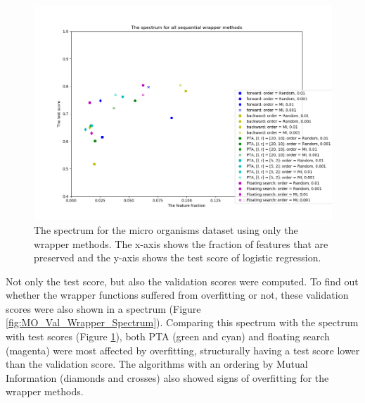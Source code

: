 \documentclass[10pt,a4paper]{article}
\begin{document}
	\begin{figure}[H]
		\includegraphics[width=1\textwidth]{MO_Test_Wrapper_Spectrum.png}
		\caption{The spectrum for the micro organisms dataset using only the wrapper methods. The x-axis shows the fraction of features that are preserved and the y-axis shows the test score of logistic regression.}
		\label{fig:MO_Test_Wrapper_Spectrum}
	\end{figure}

	Not only the test score, but also the validation scores were computed. To find out whether the wrapper functions suffered from overfitting or not, these validation scores were also shown in a spectrum (Figure \ref{fig:MO_Val_Wrapper_Spectrum}). Comparing this spectrum with the spectrum with test scores (Figure \ref{fig:MO_Test_Wrapper_Spectrum}), both PTA (green and cyan) and floating search (magenta) were most affected by overfitting, structurally having a test score lower than the validation score. The algorithms with an ordering by Mutual Information (diamonds and crosses) also showed signs of overfitting for the wrapper methods.
\end{document}
